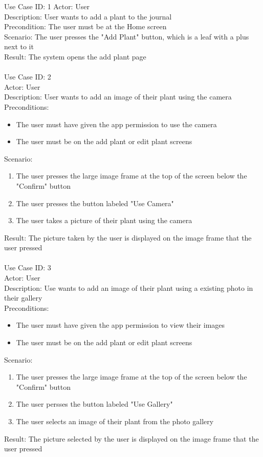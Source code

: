 \documentclass{sigchi}
\begin{document}
Use Case ID: 1
Actor: User \\
Description: User wants to add a plant to the journal \\
Precondition: The user must be at the Home screen \\
Scenario: The user presses the "Add Plant" button, which is a leaf with a plus next to it \\
Result: The system opens the add plant page \\
\\

Use Case ID: 2 \\
Actor: User \\
Description: User wants to add an image of their plant using the camera \\
Preconditions: \begin{itemize}
    \item The user must have given the app permission to use the camera
    \item The user must be on the add plant or edit plant screens
\end{itemize}
Scenario: \begin{enumerate}
    \item The user presses the large image frame at the top of the screen below the "Confirm" button
    \item The user presses the button labeled "Use Camera"
    \item The user takes a picture of their plant using the camera
\end{enumerate}
Result: The picture taken by the user is displayed on the image frame that the user pressed \\
\\

Use Case ID: 3 \\
Actor: User \\
Description: Use wants to add an image of their plant using a existing photo in their gallery \\
Preconditions: \begin{itemize}
    \item The user must have given the app permission to view their images
    \item The user must be on the add plant or edit plant screens
\end{itemize}
Scenario: \begin{enumerate}
    \item The user presses the large image frame at the top of the screen below the "Confirm" button
    \item The user persses the button labeled "Use Gallery"
    \item The user selects an image of their plant from the photo gallery
\end{enumerate}
Result: The picture selected by the user is displayed on the image frame that the user pressed \\
\\
\end{document}
